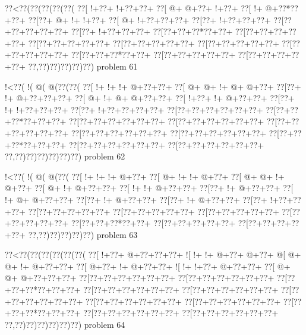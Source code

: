 \vbox{\vbox{\goo
\0??<\0??(\0??(\0??(\0??(\0??(
\0??[\- !+\0??+\- !+\0??+\0??+
\0??[\- @+\- @+\0??+\- !+\0??+
\0??[\- !+\- @+\0??*\0??+\0??+
\0??[\0??+\- @+\- !+\- !+\0??+
\0??[\- @+\- !+\0??+\0??+\0??+
\0??[\0??+\- !+\0??+\0??+\0??+
\0??[\0??+\0??+\0??+\0??+\0??+
\0??[\0??+\- !+\0??+\0??+\0??+
\0??[\0??+\0??+\0??*\0??+\0??+
\0??[\0??+\0??+\0??+\0??+\0??+
\0??[\0??+\0??+\0??+\0??+\0??+
\0??[\0??+\0??+\0??+\0??+\0??+
\0??[\0??+\0??+\0??+\0??+\0??+
\0??[\0??+\0??+\0??+\0??+\0??+
\0??[\0??+\0??+\0??*\0??+\0??+
\0??[\0??+\0??+\0??+\0??+\0??+
\0??[\0??+\0??+\0??+\0??+\0??+
\0??,\0??)\0??)\0??)\0??)\0??)
}
\hfil problem 61\hfil\break
}

\vbox{\vbox{\goo
\- !<\0??(\- !(\- @(\- @(\0??(\0??(
\0??[\- !+\- !+\- !+\- @+\0??+\0??+
\0??[\- @+\- @+\- !+\- @+\- @+\0??+
\0??[\0??+\- !+\- @+\0??+\0??+\0??+
\0??[\- @+\- !+\- @+\- @+\0??+\0??+
\0??[\- !+\0??+\- !+\- @+\0??+\0??+
\0??[\0??+\- !+\- !+\0??+\0??+\0??+
\0??[\0??+\- !+\0??+\0??+\0??+\0??+
\0??[\0??+\0??+\0??+\0??+\0??+\0??+
\0??[\0??+\0??+\0??*\0??+\0??+\0??+
\0??[\0??+\0??+\0??+\0??+\0??+\0??+
\0??[\0??+\0??+\0??+\0??+\0??+\0??+
\0??[\0??+\0??+\0??+\0??+\0??+\0??+
\0??[\0??+\0??+\0??+\0??+\0??+\0??+
\0??[\0??+\0??+\0??+\0??+\0??+\0??+
\0??[\0??+\0??+\0??*\0??+\0??+\0??+
\0??[\0??+\0??+\0??+\0??+\0??+\0??+
\0??[\0??+\0??+\0??+\0??+\0??+\0??+
\0??,\0??)\0??)\0??)\0??)\0??)\0??)
}
\hfil problem 62\hfil\break
}

\vbox{\vbox{\goo
\- !<\0??(\- !(\- @(\- @(\0??(
\0??[\- !+\- !+\- !+\- @+\0??+
\0??[\- @+\- !+\- !+\- @+\0??+
\0??[\- @+\- @+\- !+\- @+\0??+
\0??[\- @+\- !+\- @+\0??+\0??+
\0??[\- !+\- !+\- @+\0??+\0??+
\0??[\0??+\- !+\- @+\0??+\0??+
\0??[\- !+\- @+\- @+\0??+\0??+
\0??[\0??+\- !+\- @+\0??+\0??+
\0??[\0??+\- !+\- @+\0??+\0??+
\0??[\0??+\- !+\0??+\0??+\0??+
\0??[\0??+\0??+\0??+\0??+\0??+
\0??[\0??+\0??+\0??+\0??+\0??+
\0??[\0??+\0??+\0??+\0??+\0??+
\0??[\0??+\0??+\0??+\0??+\0??+
\0??[\0??+\0??+\0??*\0??+\0??+
\0??[\0??+\0??+\0??+\0??+\0??+
\0??[\0??+\0??+\0??+\0??+\0??+
\0??,\0??)\0??)\0??)\0??)\0??)
}
\hfil problem 63\hfil\break
}

\vbox{\vbox{\goo
\0??<\0??(\0??(\0??(\0??(\0??(\0??(
\0??[\- !+\0??+\- @+\0??+\0??+\0??+
\- ![\- !+\- !+\- @+\0??+\- @+\0??+
\- @[\- @+\- @+\- !+\- @+\0??+\0??+
\0??[\- @+\0??+\- !+\- @+\0??+\0??+
\- ![\- !+\- !+\0??+\- @+\0??+\0??+
\0??[\- @+\- @+\- @+\0??+\0??+\0??+
\0??[\0??+\0??+\0??+\0??+\0??+\0??+
\0??[\0??+\0??+\0??+\0??+\0??+\0??+
\0??[\0??+\0??+\0??*\0??+\0??+\0??+
\0??[\0??+\0??+\0??+\0??+\0??+\0??+
\0??[\0??+\0??+\0??+\0??+\0??+\0??+
\0??[\0??+\0??+\0??+\0??+\0??+\0??+
\0??[\0??+\0??+\0??+\0??+\0??+\0??+
\0??[\0??+\0??+\0??+\0??+\0??+\0??+
\0??[\0??+\0??+\0??*\0??+\0??+\0??+
\0??[\0??+\0??+\0??+\0??+\0??+\0??+
\0??[\0??+\0??+\0??+\0??+\0??+\0??+
\0??,\0??)\0??)\0??)\0??)\0??)\0??)
}
\hfil problem 64\hfil\break
}

